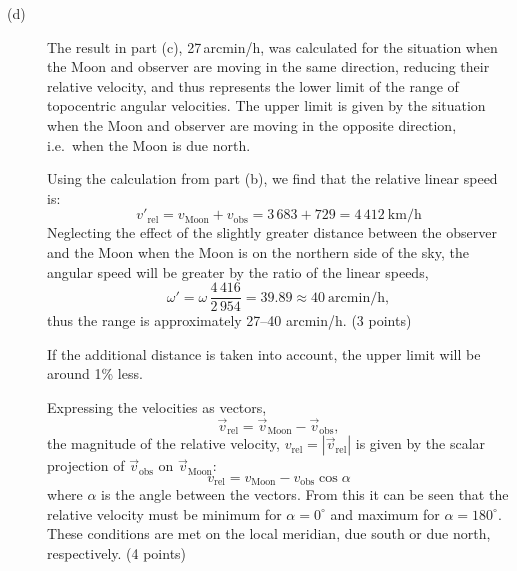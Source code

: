 \begin{description}
\item[(d)] The result in part (c), 27\,arcmin/h, was calculated for the
  situation when the Moon and observer are moving in the same direction,
  reducing their relative velocity, and thus represents the lower limit of the
  range of topocentric angular velocities. The upper limit is given by the
  situation when the Moon and observer are moving in the opposite direction,
  i.e.\ when the Moon is due north.

  Using the calculation from part (b), we find that the relative linear speed
  is:
  \[
    v'_{\mathrm{rel}} = v_{\mathrm{Moon}} + v_{\mathrm{obs}}
                      = 3\,683 + 729 = 4\,412\ \mathrm{km/h}
  \]
  Neglecting the effect of the slightly greater distance between the observer
  and the Moon when the Moon is on the northern side of the sky, the angular
  speed will be greater by the ratio of the linear speeds,
  \[
    \omega' = \omega\,\frac{4\,416}{2\,954} = 39.89
            \approx 40\ \mathrm{arcmin/h},
  \]
  thus the range is approximately 27--40 arcmin/h. \hfill(3 points)

  If the additional distance is taken into account, the upper limit will be
  around 1\% less.

  Expressing the velocities as vectors,
  \[
    \vec{v}_{\mathrm{rel}} = \vec{v}_{\mathrm{Moon}} - \vec{v}_{\mathrm{obs}},
  \]
  the magnitude of the relative velocity,
  $v_{\mathrm{rel}} = |\vec{v}_{\mathrm{rel}}|$ is given by the scalar
  projection of $\vec{v}_{\mathrm{obs}}$ on $\vec{v}_{\mathrm{Moon}}$:
  \[
    v_{\mathrm{rel}} = v_{\mathrm{Moon}} - v_{\mathrm{obs}}\cos\alpha
  \]
  where $\alpha$ is the angle between the vectors. From this it can be seen
  that the relative velocity must be minimum for $\alpha = 0^\circ$ and
  maximum for $\alpha = 180^\circ$. These conditions are met on the local
  meridian, due south or due north, respectively. \hfill(4 points)
\end{description}

